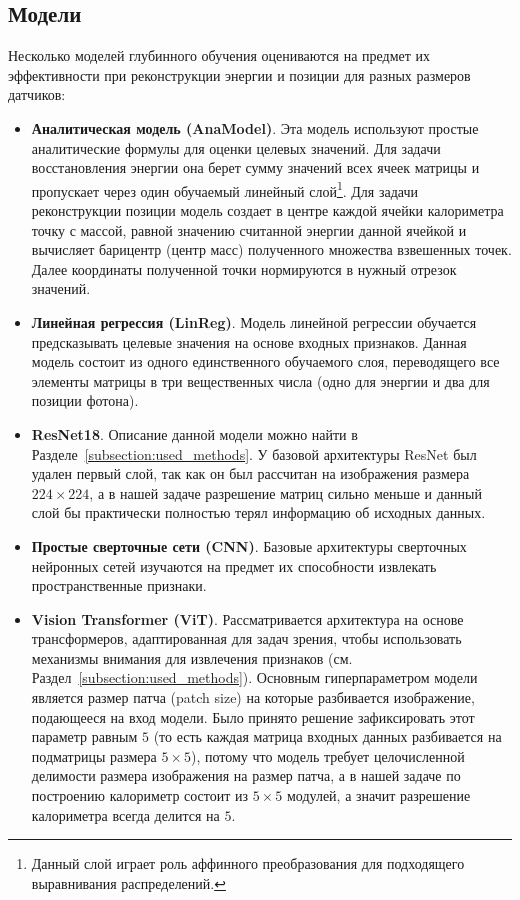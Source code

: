 \documentclass[a4paper,12pt]{extarticle}
\begin{document}
\subsection{Модели}

Несколько моделей глубинного обучения оцениваются на предмет их эффективности при реконструкции энергии и позиции для разных размеров датчиков:

\begin{itemize}
    \item \textbf{Аналитическая модель (AnaModel)}. Эта модель используют простые аналитические формулы для оценки целевых значений. Для задачи восстановления энергии она берет сумму значений всех ячеек матрицы и пропускает через один обучаемый линейный слой\footnote{Данный слой играет роль аффинного преобразования для подходящего выравнивания распределений.}. Для задачи реконструкции позиции модель создает в центре каждой ячейки калориметра точку с массой, равной значению считанной энергии данной ячейкой и вычисляет барицентр (центр масс) полученного множества взвешенных точек. Далее координаты полученной точки нормируются в нужный отрезок значений.
    \item \textbf{Линейная регрессия (LinReg)}. Модель линейной регрессии обучается предсказывать целевые значения на основе входных признаков. Данная модель состоит из одного единственного обучаемого слоя, переводящего все элементы матрицы в три вещественных числа (одно для энергии и два для позиции фотона).
    \item \textbf{ResNet18}. Описание данной модели можно найти в Разделе~\ref{subsection:used_methods}. У базовой архитектуры ResNet был удален первый слой, так как он был рассчитан на изображения размера $224 \times 224$, а в нашей задаче разрешение матриц сильно меньше и данный слой бы практически полностью терял информацию об исходных данных.
    \item \textbf{Простые сверточные сети (CNN)}. Базовые архитектуры сверточных нейронных сетей изучаются на предмет их способности извлекать пространственные признаки.
    \item \textbf{Vision Transformer (ViT)}. Рассматривается архитектура на основе трансформеров, адаптированная для задач зрения, чтобы использовать механизмы внимания для извлечения признаков (см. Раздел~\ref{subsection:used_methods}). Основным гиперпараметром модели является размер патча (patch size) на которые разбивается изображение, подающееся на вход модели. Было принято решение зафиксировать этот параметр равным $5$ (то есть каждая матрица входных данных разбивается на подматрицы размера $5 \times 5$), потому что модель требует целочисленной делимости размера изображения на размер патча, а в нашей задаче по построению калориметр состоит из $5 \times 5$ модулей, а значит разрешение калориметра всегда делится на $5$.
\end{itemize}
\end{document}
